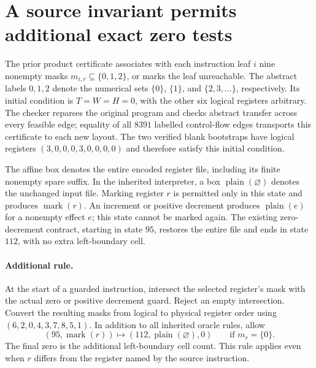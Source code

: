 \section{A source invariant permits additional exact zero tests}
\label{sec:runtime-known-zero}

The prior product certificate associates with each instruction leaf $i$ nine
nonempty masks $m_{i,r}\subseteq\{0,1,2\}$, or marks the leaf unreachable.
The abstract labels $0,1,2$ denote the numerical sets $\{0\}$, $\{1\}$, and
$\{2,3,\ldots\}$, respectively.  Its initial condition is $T=W=H=0$, with the other six
logical registers arbitrary.  The checker reparses the original program and
checks abstract transfer across every feasible edge; equality of all $8391$
labelled control-flow edges transports this certificate to each new layout.
The two verified blank bootstraps have logical registers
$(3,0,0,0,3,0,0,0,0)$ and therefore satisfy this initial condition.

The affine box denotes the entire encoded register file, including its finite
nonempty spare suffix.  In the inherited interpreter, a box
$\operatorname{plain}(\varnothing)$ denotes the unchanged input file.  Marking
register $r$ is permitted only in this state and produces
$\operatorname{mark}(r)$.  An increment or positive decrement produces
$\operatorname{plain}(e)$ for a nonempty effect $e$; this state cannot be marked
again.  The existing zero-decrement contract, starting in state $95$, restores
the entire file and ends in state $112$, with no extra left-boundary cell.

\paragraph{Additional rule.}
At the start of a guarded instruction, intersect the selected register's mask
with the actual zero or positive decrement guard.  Reject an empty
intersection.  Convert the resulting masks from logical to physical register
order using $(6,2,0,4,3,7,8,5,1)$.  In addition to all inherited oracle rules,
allow
\[
 (95,\operatorname{mark}(r))\longmapsto
 (112,\operatorname{plain}(\varnothing),0)
 \qquad\text{if }m_r=\{0\}.
\]
The final zero is the additional left-boundary cell count.  This rule applies
even when $r$ differs from the register named by the source instruction.

